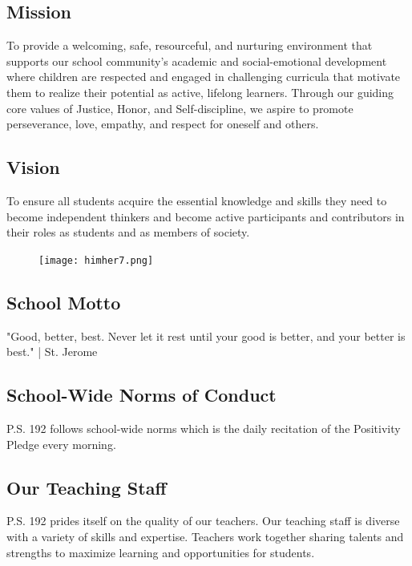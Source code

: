 \documentclass[11pt, letterpaper]{article}
\begin{document}
\subsection{Mission}
To provide a welcoming, safe, resourceful, and nurturing environment that supports our school community's academic and social-emotional development where children are respected and engaged in challenging curricula that motivate them to realize their potential as active, lifelong learners. Through our guiding core values of Justice, Honor, and Self-discipline, we aspire to promote perseverance, love, empathy, and respect for oneself and others.

\subsection{Vision}
To ensure all students acquire the essential knowledge and skills they need to become independent thinkers and become active participants and contributors in their roles as students and as members of society.

\begin{figure}
\centering
\texttt{[image: himher7.png]}
\end{figure}

\subsection{School Motto}
"Good, better, best. Never let it rest until your good is better, and your better is best." | St. Jerome

\subsection{School-Wide Norms of Conduct}
P.S. 192 follows school-wide norms which is the daily recitation of the Positivity Pledge every morning.

\subsection{Our Teaching Staff}
P.S. 192 prides itself on the quality of our teachers. Our teaching staff is diverse with a variety of skills and expertise. Teachers work together sharing talents and strengths to maximize learning and opportunities for students.
\end{document}
